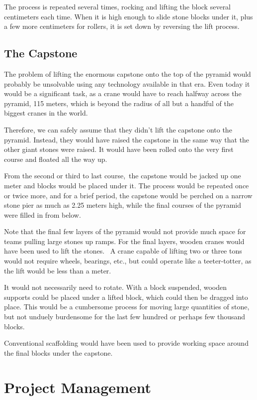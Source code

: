 \documentclass[letterpaper,11pt]{article}
\begin{document}
The process is repeated several times, rocking and lifting the block several centimeters each time. 
When it is high enough to slide stone blocks under it, plus a few more centimeters for rollers, it is set down by reversing the lift process.  


\subsection{The Capstone}

The problem of lifting the enormous capstone onto the top of the pyramid would probably be unsolvable using any technology available in that era. 
Even today it would be a significant task, as a crane would have to reach halfway across the pyramid, 115 meters, which is 
beyond the radius of all but a handful of the biggest cranes in the world.

Therefore, we can safely assume that they didn't lift the capstone onto the pyramid. 
Instead, they would have raised the capstone in the same way that the other giant stones were raised. 
It would have been rolled onto the very first course and floated all the way up. 

From the second or third to last course, the capstone would be jacked up one meter and blocks would be placed under it. 
The process would be repeated once or twice more, and for a brief period, the capstone would be perched on a narrow stone pier as 
much as 2.25 meters high, while the final courses of the pyramid were filled in from below. 

Note that the final few layers of the pyramid would not provide much space for teams pulling large stones up ramps. 
For the final layers, wooden cranes would have been used to lift the stones.  
A crane capable of lifting two or three tons would not require wheels, bearings, etc., but could operate like a teeter-totter, as the lift 
would be less than a meter.  

It would not necessarily need to rotate. 
With a block suspended, wooden supports could be placed under a lifted block, which could then be 
dragged into place.
This would be a cumbersome process for moving large quantities of stone, but not unduely burdensome for the last
few hundred or perhaps few thousand blocks.

Conventional scaffolding would have been used to provide working space around the final blocks under the capstone.

\section{Project Management}
\end{document}
